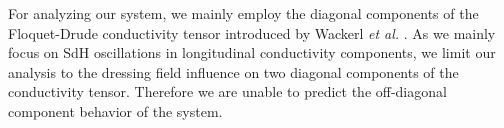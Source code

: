 \documentclass{article}
\begin{document}
For analyzing our system, we mainly employ the diagonal components of the Floquet-Drude conductivity tensor introduced by Wackerl \textit{et al.} \cite{wackerl20}. As we mainly focus on SdH oscillations in longitudinal conductivity components, we limit our analysis to the dressing field influence on two diagonal components of the conductivity tensor. Therefore we are unable to predict the off-diagonal component behavior of the system.
%
%
\end{document}
